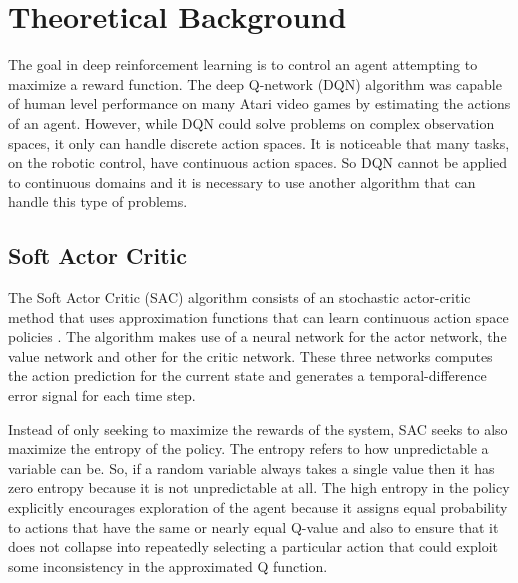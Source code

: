 \section{Theoretical Background}

The goal in deep reinforcement learning is to control an agent attempting to maximize a reward function. 
The deep Q-network (DQN) algorithm \cite{mnih2013playing} was capable of human level performance on many Atari video games by estimating the actions of an agent.
However, while DQN could solve problems on complex observation spaces, it only can handle discrete action spaces. 
It is noticeable that many tasks, on the robotic control, have continuous action spaces. 
So DQN cannot be applied to continuous domains and it is necessary to use another algorithm that can handle this type of problems.

\subsection{Soft Actor Critic}

The Soft Actor Critic (SAC) algorithm consists of an stochastic actor-critic method that uses approximation functions that can learn continuous action space policies \cite{haarnoja2018soft}. 
The algorithm makes use of a neural network for the actor network, the value network and other for the critic network. 
These three networks computes the action prediction for the current state and generates a temporal-difference error signal for each time step.


Instead of only seeking to maximize the rewards of the system, SAC seeks to also maximize the entropy of the policy.
The entropy refers to how unpredictable a variable can be. 
So, if a random variable always takes a single value then it has zero entropy because it is not unpredictable at all. 
The high entropy in the policy explicitly encourages exploration of the agent because it assigns equal probability to actions that have the same or nearly equal Q-value and also to ensure that it does not collapse into repeatedly selecting a particular action that could exploit some inconsistency in the approximated Q function.
